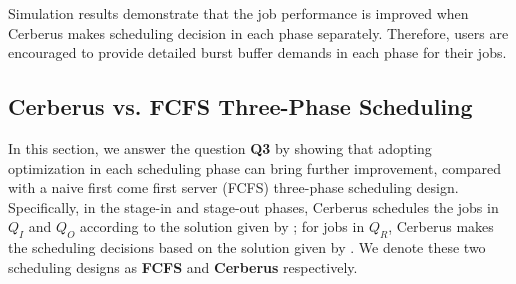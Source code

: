 
Simulation results demonstrate that the job performance is improved 
when Cerberus makes scheduling decision in each phase separately.
Therefore, users are encouraged to provide detailed burst buffer demands in each phase for their jobs.


\subsection{Cerberus vs. FCFS Three-Phase Scheduling}

In this section, we answer the question \textbf{Q3} by showing that
adopting optimization in each scheduling phase can bring further improvement,
compared with a naive first come first server (FCFS) three-phase scheduling design.
Specifically, in the stage-in and stage-out phases, Cerberus schedules the jobs in $Q_I$ and $Q_O$
according to the solution given by ;
for jobs in $Q_R$, Cerberus makes the scheduling decisions
based on the solution given by . %
We denote these two scheduling designs
as \textbf{FCFS} and \textbf{Cerberus} respectively.

